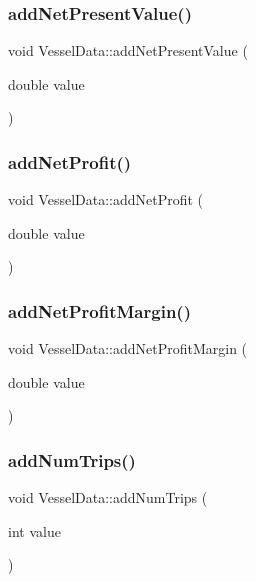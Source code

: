 \subsubsection{\texorpdfstring{addNetPresentValue()}{addNetPresentValue()}}
{\footnotesize\ttfamily void Vessel\+Data\+::add\+Net\+Present\+Value (\begin{DoxyParamCaption}\item[{double}]{value }\end{DoxyParamCaption})}

\mbox{\label{class_vessel_data_a874fcedc2ee86909c2fab33c682164a5}} 
\subsubsection{\texorpdfstring{addNetProfit()}{addNetProfit()}}
{\footnotesize\ttfamily void Vessel\+Data\+::add\+Net\+Profit (\begin{DoxyParamCaption}\item[{double}]{value }\end{DoxyParamCaption})}

\mbox{\label{class_vessel_data_a6cf0b16c6070fb0b71a2a94aa0255d59}} 
\subsubsection{\texorpdfstring{addNetProfitMargin()}{addNetProfitMargin()}}
{\footnotesize\ttfamily void Vessel\+Data\+::add\+Net\+Profit\+Margin (\begin{DoxyParamCaption}\item[{double}]{value }\end{DoxyParamCaption})}

\mbox{\label{class_vessel_data_a4abdf35337d4a7745c795d0f5afcd596}} 
\subsubsection{\texorpdfstring{addNumTrips()}{addNumTrips()}}
{\footnotesize\ttfamily void Vessel\+Data\+::add\+Num\+Trips (\begin{DoxyParamCaption}\item[{int}]{value }\end{DoxyParamCaption})}

